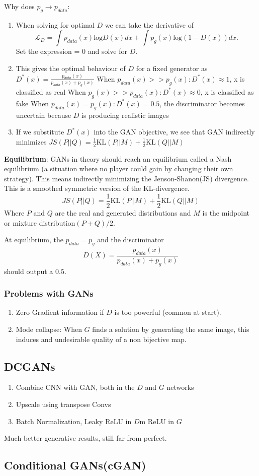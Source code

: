 Why does \(p_g \rightarrow p_{data}\):
\begin{enumerate}
    \item When solving for optimal \(D\) we can take the derivative of 
    \[
    \mathcal{L}_D = \int p_{data}(x) \text{log}D(x)dx + \int p_g(x)\text{log}(1-D(x))dx.
    \]
    Set the expression = 0 and solve for \(D\).
    \item This gives the optimal behaviour of \(D\) for a fixed generator as \(D^*(x) = \frac{p_{data}(x)}{p_{data}(x) + p_g(x)}\)
    \subitem When \(p_{data}(x) >> p_g(x) : D^*(x) \approx 1\), x is classified as real
    \subitem When \(p_{g}(x) >> p_{data}(x) : D^*(x) \approx 0\), x is classified as fake
    \subitem When \(p_{data}(x) = p_g(x) : D^*(x) = 0.5\), the discriminator becomes uncertain because \(D\) is producing realistic images
    \item If we substitute \(D^*(x)\) into the GAN objective, we see that GAN indirectly minimizes \(JS(P||Q) = \frac{1}{2}\text{KL}(P||M) +\frac{1}{2}\text{KL}(Q||M) \)
\end{enumerate}

\textbf{Equilibrium}: GANs in theory should reach an equilibrium called a Nash equilibrium (a situation where no player could gain by changing their own strategy).
This means indirectly minimizing the Jenson-Shanon(JS) divergence.
This is a smoothed symmetric version of the KL-divergence.
\[
JS(P||Q) = \frac{1}{2}\text{KL}(P||M) +\frac{1}{2}\text{KL}(Q||M)
\]
Where \(P\) and \(Q\) are the real and generated distributions and \(M\) is the midpoint or mixture distribution\((P+Q)/2\).

At equilibrium, the \(p_{data} = p_g\) and the discriminator
\[
D(X) = \frac{p_{data}(x)}{p_{data}(x) + p_g(x)}
\]
should output a \(0.5\).

\subsubsection{Problems with GANs}
\begin{enumerate}
    \item Zero Gradient information if \(D\) is too powerful (common at start).
    \item Mode collapse: When \(G\) finds a solution by generating the same image, this induces and undesirable quality of a non bijective map.
\end{enumerate}
\subsection{DCGANs}
\begin{enumerate}
    \item Combine CNN with GAN, both in the \(D\) and \(G\) networks
    \item Upscale using transpose Convs 
    \item Batch Normalization, Leaky ReLU in \(D\)m ReLU in \(G\)
\end{enumerate}
Much better generative results, still far from perfect.

\subsection{Conditional GANs(cGAN)}